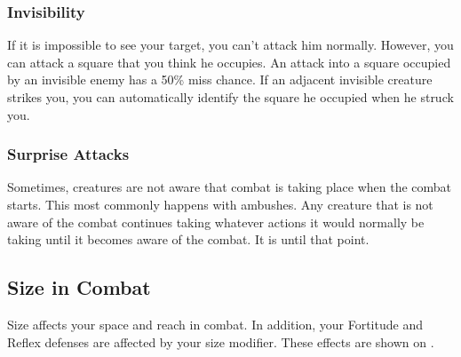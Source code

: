         \subsubsection{Invisibility}\label{Invisibility}
            If it is impossible to see your target, you can't attack him normally. However, you can attack a square that you think he occupies. An attack into a square occupied by an invisible enemy has a 50\% miss chance. If an adjacent invisible creature strikes you, you can automatically identify the square he occupied when he struck you.

        \subsubsection{Surprise Attacks}\label{Surprise Attacks}
            Sometimes, creatures are not aware that combat is taking place when the combat starts. This most commonly happens with ambushes. Any creature that is not aware of the combat continues taking whatever actions it would normally be taking until it becomes aware of the combat. It is \unaware until that point.

    \subsection{Size in Combat}\label{Size in Combat}
        Size affects your space and reach in combat.
        In addition, your Fortitude and Reflex defenses are affected by your size modifier.
        These effects are shown on .


